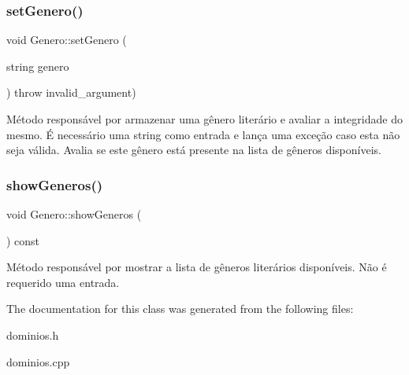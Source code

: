 \subsubsection{\texorpdfstring{set\+Genero()}{setGenero()}}
{\footnotesize\ttfamily void Genero\+::set\+Genero (\begin{DoxyParamCaption}\item[{string}]{genero }\end{DoxyParamCaption}) throw  invalid\+\_\+argument) }

Método responsável por armazenar uma gênero literário e avaliar a integridade do mesmo. É necessário uma string como entrada e lança uma exceção caso esta não seja válida. Avalia se este gênero está presente na lista de gêneros disponíveis. \mbox{\label{classGenero_a1f7c047f6d2c5b75520673a5c3cca6a6}} 
\subsubsection{\texorpdfstring{show\+Generos()}{showGeneros()}}
{\footnotesize\ttfamily void Genero\+::show\+Generos (\begin{DoxyParamCaption}{ }\end{DoxyParamCaption}) const}

Método responsável por mostrar a lista de gêneros literários disponíveis. Não é requerido uma entrada. 

The documentation for this class was generated from the following files\+:\begin{DoxyCompactItemize}
\item 
dominios.\+h\item 
dominios.\+cpp\end{DoxyCompactItemize}
